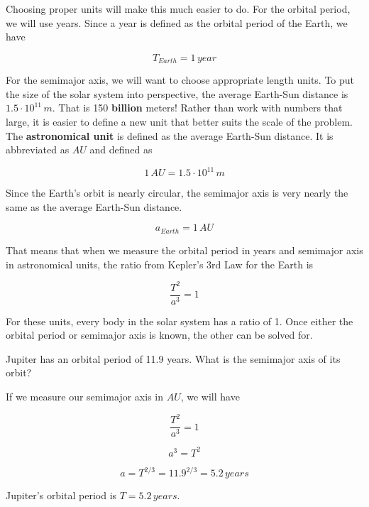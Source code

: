 \documentclass[12pt]{book}
\begin{document}
Choosing proper units will make this much easier to do. For the orbital period, we will use years. Since a year is defined as the orbital period of the Earth, we have

\begin{equation}
T_{Earth} = 1 \, year
\end{equation} 

For the semimajor axis, we will want to choose appropriate length units. To put the size of the solar system into perspective, the average Earth-Sun distance is $1.5 \cdot 10^{11} \, m$. That is 150 \textbf{billion} meters! Rather than work with numbers that large, it is easier to define a new unit that better suits the scale of the problem. The \textbf{astronomical unit} is defined as the average Earth-Sun distance. It is abbreviated as $AU$ and defined as

\begin{equation}
1 \, AU = 1.5 \cdot 10^{11} \, m
\end{equation}

Since the Earth's orbit is nearly circular, the semimajor axis is very nearly the same as the average Earth-Sun distance.

\begin{equation}
a_{Earth} = 1 \, AU
\end{equation}

That means that when we measure the orbital period in years and semimajor axis in astronomical units, the ratio from Kepler's 3rd Law for the Earth is

\begin{equation}
\frac{T^2}{a^3} = 1
\end{equation}

For these units, every body in the solar system has a ratio of 1. Once either the orbital period or semimajor axis is known, the other can be solved for.

\begin{exampleblock}

Jupiter has an orbital period of 11.9 years. What is the semimajor axis of its orbit?

\hspace{10pt}

If we measure our semimajor axis in $AU$, we will have

\begin{equation}
\frac{T^2}{a^3} = 1
\end{equation}

\begin{equation}
a^3 = T^2
\end{equation}

\begin{equation}
a = T^{2/3} = 11.9^{2/3} = 5.2 \, years
\end{equation}

Jupiter's orbital period is $T = 5.2 \, years$.

\end{exampleblock}
\end{document}
